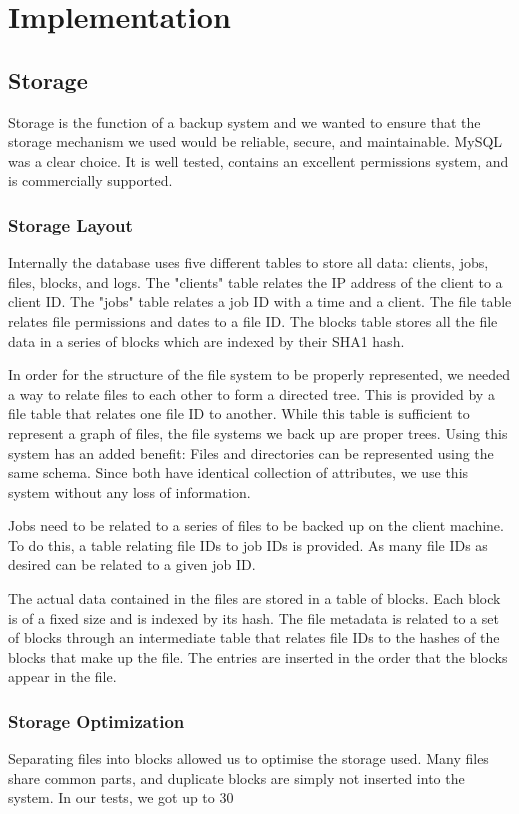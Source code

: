 \chapter{Implementation}

\section{Storage}
Storage is the function of a backup system and we wanted to ensure that the storage mechanism we used would be reliable, secure, and maintainable. MySQL was a clear choice. It is well tested, contains an excellent permissions system, and is commercially supported. 
\subsection{Storage Layout}
Internally the database uses five different tables to store all data: clients, jobs, files, blocks, and logs. The "clients" table relates the IP address of the client to a client ID. The "jobs" table relates a job ID  with a time and a client. The file table relates file permissions and dates to a file ID. The blocks table stores all the file data in a series of blocks which are indexed by their SHA1 hash.

In order for the structure of the file system to be properly represented, we needed a way to relate files to each other to form a directed tree. This is provided by a file table that relates one file ID to another. While this table is sufficient to represent a graph of files, the file systems we back up are proper trees. Using this system has an added benefit: Files and directories can be represented using the same schema. Since both have identical collection of attributes, we use this system without any loss of information.

Jobs need to be related to a series of files to be backed up on the client machine. To do this, a table relating file IDs to job IDs is provided. As many file IDs as desired can be related to a given job ID.

The actual data contained in the files are stored in a table of blocks. Each block is of a fixed size and is indexed by its hash. The file metadata is related to a set of blocks through an intermediate table that relates file IDs to the hashes of the blocks that make up the file. The entries are inserted in the order that the blocks appear in the file.

\subsection{Storage Optimization}
Separating files into blocks allowed us to optimise the storage used. Many files share common parts, and duplicate blocks are simply not inserted into the system. In our tests, we got up to 30%
